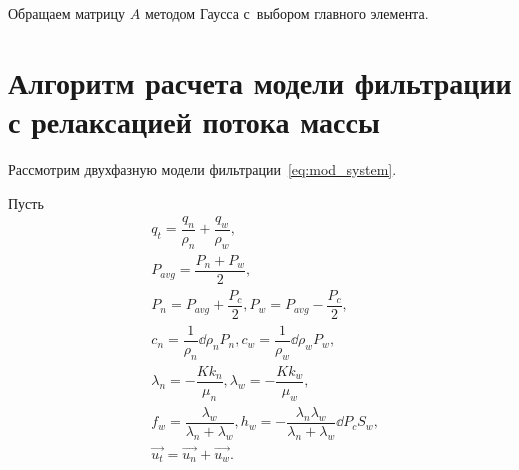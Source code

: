 Обращаем матрицу $A$ методом Гаусса с~выбором главного элемента\cite{Kalitkin}.

\section{Алгоритм расчета модели фильтрации с релаксацией потока массы} \label{sec:ch2/sec3}

Рассмотрим двухфазную модели фильтрации~\eqref{eq:mod_system}.

Пусть 
\begin{subequations} \label{eq:subs}
  \begin{align}
    &q_t = \dfrac{q_n}{\rho_n} + \dfrac{q_w}{\rho_w}, \\
    &P_{avg} = \dfrac{P_n + P_w}{2}, \\
    &P_n = P_{avg} + \dfrac{P_c}{2},
     P_w = P_{avg} - \dfrac{P_c}{2}, \\
    &c_n = \dfrac{1}{\rho_n} \dd{\rho_n}{P_n},
     c_w = \dfrac{1}{\rho_w} \dd{\rho_w}{P_w}, \\
    &\lambda_n = -\dfrac{K k_n}{\mu_n},
     \lambda_w = -\dfrac{K k_w}{\mu_w}, \\
    & f_w = \dfrac{\lambda_w}{\lambda_n + \lambda_w},
      h_w = - \dfrac{\lambda_n\lambda_w}{\lambda_n + \lambda_w} \dd{P_c}{S_w}, \\
    & \overrightarrow{u_t} = \overrightarrow{u_n} + \overrightarrow{u_w}.
  \end{align}
\end{subequations}


